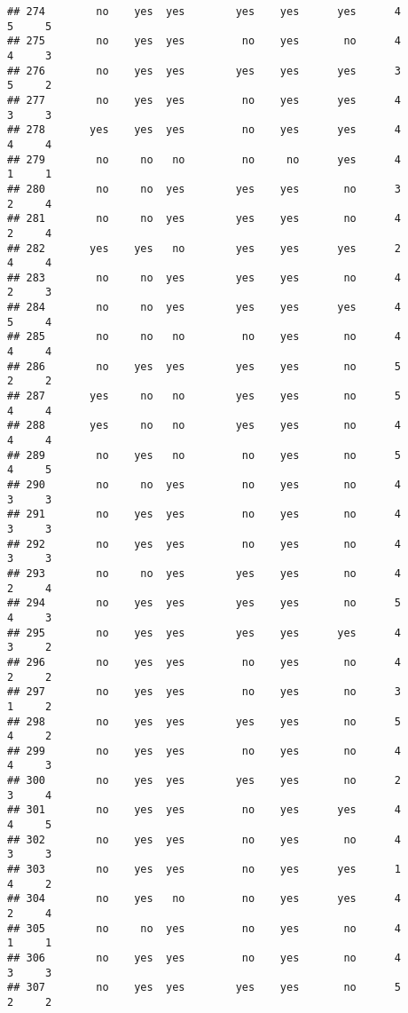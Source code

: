 \documentclass[]{article}
\begin{document}
\begin{verbatim}
## 274        no    yes  yes        yes    yes      yes      4        5     5
## 275        no    yes  yes         no    yes       no      4        4     3
## 276        no    yes  yes        yes    yes      yes      3        5     2
## 277        no    yes  yes         no    yes      yes      4        3     3
## 278       yes    yes  yes         no    yes      yes      4        4     4
## 279        no     no   no         no     no      yes      4        1     1
## 280        no     no  yes        yes    yes       no      3        2     4
## 281        no     no  yes        yes    yes       no      4        2     4
## 282       yes    yes   no        yes    yes      yes      2        4     4
## 283        no     no  yes        yes    yes       no      4        2     3
## 284        no     no  yes        yes    yes      yes      4        5     4
## 285        no     no   no         no    yes       no      4        4     4
## 286        no    yes  yes        yes    yes       no      5        2     2
## 287       yes     no   no        yes    yes       no      5        4     4
## 288       yes     no   no        yes    yes       no      4        4     4
## 289        no    yes   no         no    yes       no      5        4     5
## 290        no     no  yes         no    yes       no      4        3     3
## 291        no    yes  yes         no    yes       no      4        3     3
## 292        no    yes  yes         no    yes       no      4        3     3
## 293        no     no  yes        yes    yes       no      4        2     4
## 294        no    yes  yes        yes    yes       no      5        4     3
## 295        no    yes  yes        yes    yes      yes      4        3     2
## 296        no    yes  yes         no    yes       no      4        2     2
## 297        no    yes  yes         no    yes       no      3        1     2
## 298        no    yes  yes        yes    yes       no      5        4     2
## 299        no    yes  yes         no    yes       no      4        4     3
## 300        no    yes  yes        yes    yes       no      2        3     4
## 301        no    yes  yes         no    yes      yes      4        4     5
## 302        no    yes  yes         no    yes       no      4        3     3
## 303        no    yes  yes         no    yes      yes      1        4     2
## 304        no    yes   no         no    yes      yes      4        2     4
## 305        no     no  yes         no    yes       no      4        1     1
## 306        no    yes  yes         no    yes       no      4        3     3
## 307        no    yes  yes        yes    yes       no      5        2     2

\end{verbatim}
\end{document}
